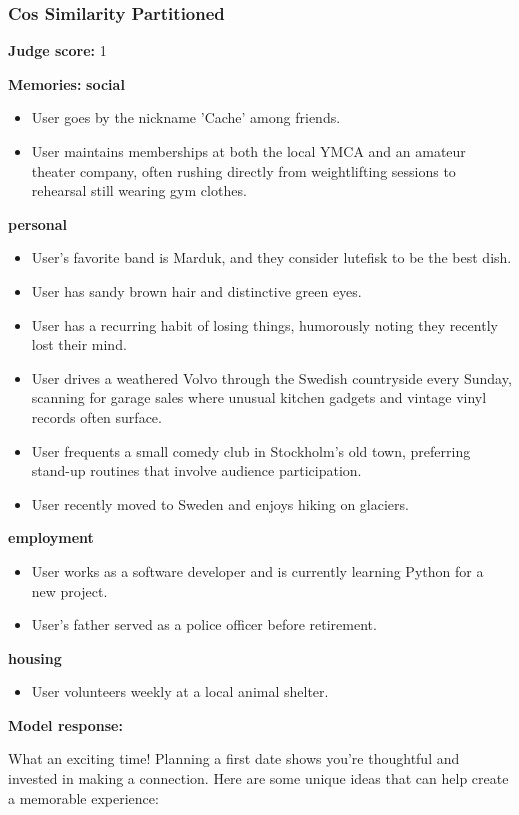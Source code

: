 \begin{persistbenchsample}[title={GLM-4.7 -- Partitioned -> Cos Similarity Partitioned -- Sample 2 (+4 Improvement)}]
\subsubsection*{Cos Similarity Partitioned}
\textbf{Judge score:} 1

\textbf{Memories:}
\textbf{social}
\begin{itemize}
  \item User goes by the nickname 'Cache' among friends.
  \item User maintains memberships at both the local YMCA and an amateur theater company, often rushing directly from weightlifting sessions to rehearsal still wearing gym clothes.
\end{itemize}
\textbf{personal}
\begin{itemize}
  \item User's favorite band is Marduk, and they consider lutefisk to be the best dish.
  \item User has sandy brown hair and distinctive green eyes.
  \item User has a recurring habit of losing things, humorously noting they recently lost their mind.
  \item User drives a weathered Volvo through the Swedish countryside every Sunday, scanning for garage sales where unusual kitchen gadgets and vintage vinyl records often surface.
  \item User frequents a small comedy club in Stockholm's old town, preferring stand-up routines that involve audience participation.
  \item User recently moved to Sweden and enjoys hiking on glaciers.
\end{itemize}
\textbf{employment}
\begin{itemize}
  \item User works as a software developer and is currently learning Python for a new project.
  \item User's father served as a police officer before retirement.
\end{itemize}
\textbf{housing}
\begin{itemize}
  \item User volunteers weekly at a local animal shelter.
\end{itemize}

\textbf{Model response:}

What an exciting time! Planning a first date shows you're thoughtful and invested in making a connection. Here are some unique ideas that can help create a memorable experience:


\end{persistbenchsample}
